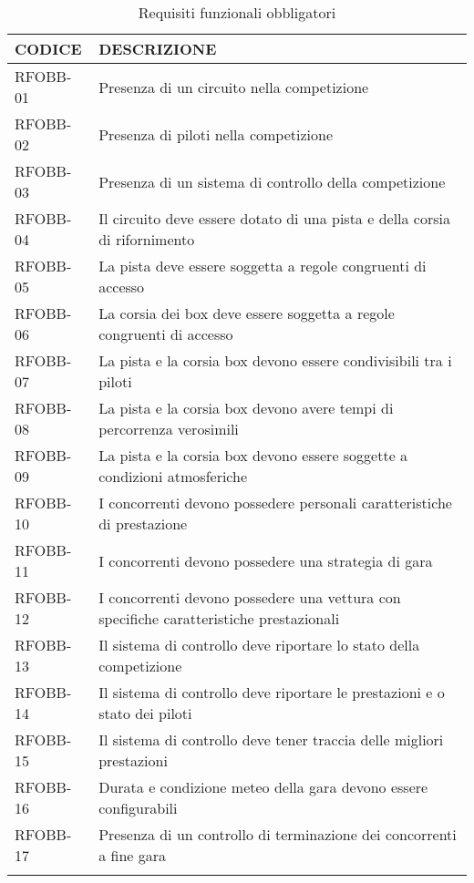 \documentclass[a4paper,11pt, twoside]{book}
\begin{document}
    \begin{longtable}{|p{2cm}|p{8cm}|}
      \toprule
	\bfseries{CODICE} & \bfseries{DESCRIZIONE} \\\hline
      \endfirsthead
      RFOBB-01 & Presenza di un circuito nella competizione \\\hline
      RFOBB-02 & Presenza di piloti nella competizione \\\hline 
      RFOBB-03 & Presenza di un sistema di controllo della competizione \\\hline
      RFOBB-04 & Il circuito deve essere dotato di una pista e della corsia di rifornimento \\\hline
      RFOBB-05 & La pista deve essere soggetta a regole congruenti di accesso \\\hline
      RFOBB-06 & La corsia dei box deve essere soggetta a regole congruenti di accesso \\\hline
      RFOBB-07 & La pista e la corsia box devono essere condivisibili tra i piloti \\\hline
      RFOBB-08 & La pista e la corsia box devono avere tempi di percorrenza verosimili \\\hline
      RFOBB-09 & La pista e la corsia box devono essere soggette a condizioni atmosferiche \\\hline
      RFOBB-10 & I concorrenti devono possedere personali caratteristiche di prestazione  \\\hline
      RFOBB-11 & I concorrenti devono possedere una strategia di gara  \\\hline
      RFOBB-12 & I concorrenti devono possedere una vettura con specifiche caratteristiche prestazionali  \\\hline
      RFOBB-13 & Il sistema di controllo deve riportare lo stato della competizione  \\\hline
      RFOBB-14 & Il sistema di controllo deve riportare le prestazioni e o stato dei piloti  \\\hline
      RFOBB-15 & Il sistema di controllo deve tener traccia delle migliori prestazioni  \\\hline
      RFOBB-16 & Durata e condizione meteo della gara devono essere configurabili  \\\hline
      RFOBB-17 & Presenza di un controllo di terminazione dei concorrenti a fine gara  \\\hline
      \caption{Requisiti funzionali obbligatori}
      \label{tbl:RequisitiFunzionaliObbligatori}
    \end{longtable}
\end{document}

